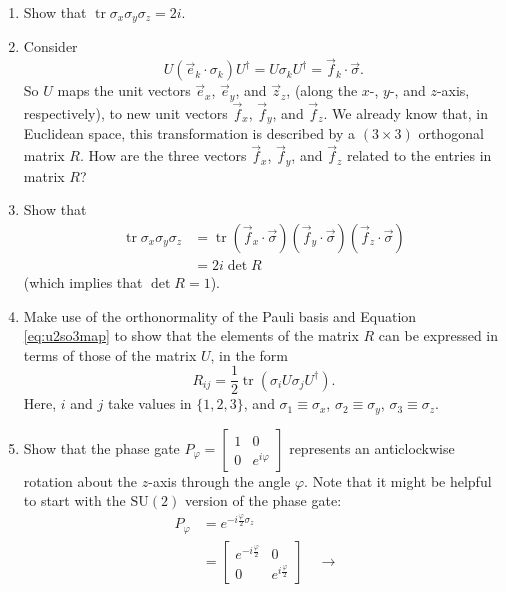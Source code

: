 \documentclass{article}
\providecommand{\tightlist}{%
  \setlength{\itemsep}{0pt}\setlength{\parskip}{0pt}}
\begin{document}
\begin{enumerate}
\def\labelenumi{\arabic{enumi}.}
\tightlist
\item
  Show that \(\operatorname{tr}\sigma_x\sigma_y\sigma_z = 2i\).
\item
  Consider
  \[
     U(\vec e_k\cdot\sigma_k)U^\dagger=U\sigma_kU^\dagger={\vec f_k}\cdot\vec\sigma.
   \]
  So \(U\) maps the unit vectors \(\vec e_x\), \(\vec e_y\), and \(\vec z_z\), (along the \(x\)-, \(y\)-, and \(z\)-axis, respectively), to new unit vectors \(\vec f_x\), \(\vec f_y\), and \(\vec f_z\).
  We already know that, in Euclidean space, this transformation is described by a \((3\times 3)\) orthogonal matrix \(R\).
  How are the three vectors \(\vec f_x\), \(\vec f_y\), and \(\vec f_z\) related to the entries in matrix \(R\)?
\item
  Show that
  \[
     \begin{aligned}
       \operatorname{tr}\sigma_x\sigma_y\sigma_z
       &= \operatorname{tr}({\vec f_x}\cdot\vec\sigma)( {\vec f_y}\cdot\vec\sigma)({\vec f_z}\cdot\vec\sigma)
     \\&= 2i\det R
     \end{aligned}
   \]
  (which implies that \(\det R=1\)).
\item
  Make use of the orthonormality of the Pauli basis and Equation \eqref{eq:u2so3map} to show that the elements of the matrix \(R\) can be expressed in terms of those of the matrix \(U\), in the form
  \[
     R_{ij}=\frac12\operatorname{tr}\left(\sigma_i U\sigma_j U^\dagger\right).
   \]
  Here, \(i\) and \(j\) take values in \(\{1,2,3\}\), and \(\sigma_1\equiv\sigma_x\), \(\sigma_2\equiv\sigma_y\), \(\sigma_3\equiv\sigma_z\).
\item
  Show that the phase gate \(P_\varphi =\begin{bmatrix}1&0\\0&e^{i\varphi}\end{bmatrix}\) represents an anticlockwise rotation about the \(z\)-axis through the angle \(\varphi\).
  Note that it might be helpful to start with the \(\mathrm{SU}(2)\) version of the phase gate:
  \[
     \begin{aligned}
       P_\varphi
       &= e^{-i\frac{\varphi}{2}\sigma_z}
     \\&= \begin{bmatrix}
         e^{-i \frac{\varphi}{2}}& 0
       \\0 & e^{i \frac{\varphi}{2}}
       \end{bmatrix}
       \quad\longrightarrow\quad

\end{aligned}\]
\end{enumerate}
\end{document}
